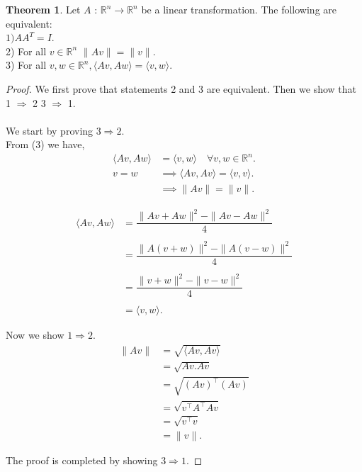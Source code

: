 \documentclass[11pt]{report}
\theoremstyle{plain}
\theoremstyle{definition}
\newtheorem{theorem}{Theorem}
\newcommand\inner[2]{\langle #1, #2 \rangle}
\begin{document}
\begin{theorem}
	Let $ A $ : $ \mathbb{R}^n \rightarrow \mathbb{R}^n$ be a linear transformation. The following are equivalent:\\	$ 1) AA^T=I.$ \\2) For all $  v \in  \mathbb{R}^n $ $ \|Av\|	= \|v\| $. \\3) For all $  v,w \in  \mathbb{R}^n , \inner{Av}{Aw} = \inner{v}{w}  $.
\end{theorem}
\begin{proof}We first prove that statements 2 and 3 are equivalent. Then we show that 1 $ \Longrightarrow $ 2  3 $ \Longrightarrow $ 1.\\
\\We start by proving $ 3 \Longrightarrow 2 $.\\
From (3) we have, 
\begin{align*}
 \inner{Av}{Aw} &= \inner{v}{w} \quad \forall v,w \in \mathbb{R}^n . \\
 v = w &\implies
\inner{Av}{Av} = \inner{v}{v}.\\ 
&\implies \|Av\|=\|v\|.
\end{align*}
  


\begin{align*}
\inner{Av}{Aw} &= \dfrac{\|Av + Aw\|^2 - \|Av - Aw\|^2}{4}\\ \\
 &= \dfrac{\|A(v+w)\|^2 - \|A(v-w)\|^2}{4}\\ \\ 
&= \dfrac{\|v + w\|^2 - \|v - w\|^2}{4}\\ \\ 
&= \inner{v}{w}.
\end{align*}


Now we show $ 1 \Longrightarrow 2 $.
\begin{align*}
\|Av\| &= \sqrt{\inner{Av}{Av}}\\
&= \sqrt{Av.Av}\\
&= \sqrt{(Av)^\intercal (Av)}  \\ 
&=\sqrt{v^\intercal A^\intercal A v} \\
&= \sqrt{v^\intercal v}\\
&= \|v\|.
\end{align*}

	
		
The proof is completed by showing $ 3 \Longrightarrow 1. $


\end{proof}
\end{document}
